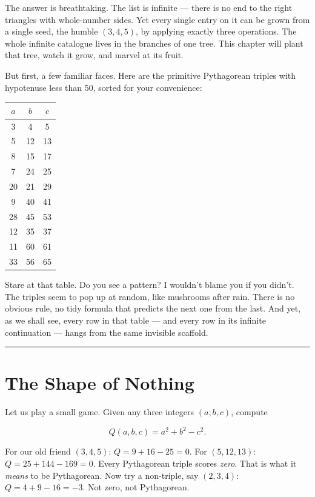 \documentclass[11pt,openany]{book}
\theoremstyle{definition}
\theoremstyle{plain}
\theoremstyle{remark}
\begin{document}
The answer is breathtaking. The list is infinite — there is no end to the right triangles with whole-number sides. Yet every single entry on it can be grown from a single seed, the humble $(3, 4, 5)$, by applying exactly three operations. The whole infinite catalogue lives in the branches of one tree. This chapter will plant that tree, watch it grow, and marvel at its fruit.

But first, a few familiar faces. Here are the primitive Pythagorean triples with hypotenuse less than 50, sorted for your convenience:

\begin{center}
\begin{tabular}{c|c|c}
\toprule
$a$ & $b$ & $c$ \\
\midrule
3 & 4 & 5 \\
5 & 12 & 13 \\
8 & 15 & 17 \\
7 & 24 & 25 \\
20 & 21 & 29 \\
9 & 40 & 41 \\
28 & 45 & 53 \\
12 & 35 & 37 \\
11 & 60 & 61 \\
33 & 56 & 65 \\
\bottomrule
\end{tabular}
\end{center}


Stare at that table. Do you see a pattern? I wouldn't blame you if you didn't. The triples seem to pop up at random, like mushrooms after rain. There is no obvious rule, no tidy formula that predicts the next one from the last. And yet, as we shall see, every row in that table — and every row in its infinite continuation — hangs from the same invisible scaffold.

\bigskip\noindent\rule{\textwidth}{0.4pt}\bigskip


\section*{The Shape of Nothing}


Let us play a small game. Given any three integers $(a, b, c)$, compute

$$Q(a, b, c) = a^2 + b^2 - c^2.$$

For our old friend $(3, 4, 5)$: $Q = 9 + 16 - 25 = 0$. For $(5, 12, 13)$: $Q = 25 + 144 - 169 = 0$. Every Pythagorean triple scores \textit{zero}. That is what it \textit{means} to be Pythagorean. Now try a non-triple, say $(2, 3, 4)$: $Q = 4 + 9 - 16 = -3$. Not zero, not Pythagorean.
\end{document}
